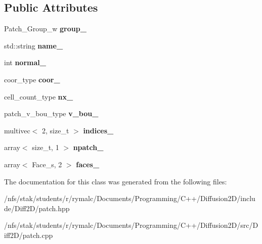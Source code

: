 \subsection*{Public Attributes}
\begin{DoxyCompactItemize}
\item 
\hypertarget{classPatch_a93fff2891647c4109c16cb4ec2079545}{Patch\+\_\+\+Group\+\_\+w {\bfseries group\+\_\+}}\label{classPatch_a93fff2891647c4109c16cb4ec2079545}

\item 
\hypertarget{classPatch_a133d268d88897aef8b20ca7da98b9cdb}{std\+::string {\bfseries name\+\_\+}}\label{classPatch_a133d268d88897aef8b20ca7da98b9cdb}

\item 
\hypertarget{classPatch_a01951c7c7aec32d184e11869ab23877d}{int {\bfseries normal\+\_\+}}\label{classPatch_a01951c7c7aec32d184e11869ab23877d}

\item 
\hypertarget{classPatch_a3beca2ce16697d8e8097ba92ee6bdc29}{coor\+\_\+type {\bfseries coor\+\_\+}}\label{classPatch_a3beca2ce16697d8e8097ba92ee6bdc29}

\item 
\hypertarget{classPatch_aa69a7e422610ce91ad4fb60c88cadbf0}{cell\+\_\+count\+\_\+type {\bfseries nx\+\_\+}}\label{classPatch_aa69a7e422610ce91ad4fb60c88cadbf0}

\item 
\hypertarget{classPatch_aea44744ce3a7d51831f67014bc89867d}{patch\+\_\+v\+\_\+bou\+\_\+type {\bfseries v\+\_\+bou\+\_\+}}\label{classPatch_aea44744ce3a7d51831f67014bc89867d}

\item 
\hypertarget{classPatch_af272c0110d640ddd191492fc9cc62990}{multivec$<$ 2, size\+\_\+t $>$ {\bfseries indices\+\_\+}}\label{classPatch_af272c0110d640ddd191492fc9cc62990}

\item 
\hypertarget{classPatch_aaa96294c5c204449ca53209b040ae06c}{array$<$ size\+\_\+t, 1 $>$ {\bfseries npatch\+\_\+}}\label{classPatch_aaa96294c5c204449ca53209b040ae06c}

\item 
\hypertarget{classPatch_a6d0bbabb9b7b1928bda12255b312fedd}{array$<$ Face\+\_\+s, 2 $>$ {\bfseries faces\+\_\+}}\label{classPatch_a6d0bbabb9b7b1928bda12255b312fedd}

\end{DoxyCompactItemize}


The documentation for this class was generated from the following files\+:\begin{DoxyCompactItemize}
\item 
/nfs/stak/students/r/rymalc/\+Documents/\+Programming/\+C++/\+Diffusion2\+D/include/\+Diff2\+D/patch.\+hpp\item 
/nfs/stak/students/r/rymalc/\+Documents/\+Programming/\+C++/\+Diffusion2\+D/src/\+Diff2\+D/patch.\+cpp\end{DoxyCompactItemize}
